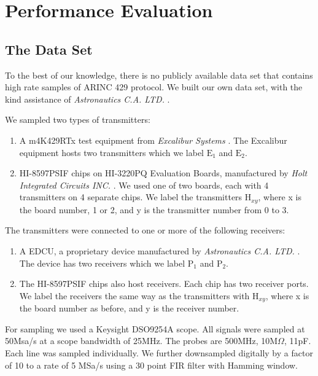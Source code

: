 \documentclass[conference]{IEEEtran}
\begin{document}
 
\section{Performance Evaluation}

\subsection{The Data Set} \label{TheDataSet}
  To the best of our knowledge, there is no publicly available data set that contains high rate samples of ARINC 429 protocol. We built our own data set, with the kind assistance of \textit{Astronautics C.A. LTD.} \cite{}.
  
  We sampled two types of transmitters:
  \begin{enumerate}
     \item A m4K429RTx test equipment from \textit{Excalibur Systems} \cite{}. The Excalibur equipment hosts two transmitters which we label \(\text{E}_1\) and \(\text{E}_2\).
     \item HI-8597PSIF chips on HI-3220PQ Evaluation Boards, manufactured by \textit{Holt Integrated Circuits INC.} \cite{}. We used one of two boards, each with 4 transmitters on 4 separate chips. We label the transmitters \(\text{H}_{xy}\), where x is the board number, 1 or 2, and y is the transmitter number from 0 to 3.
  \end{enumerate}
  
  The transmitters were connected to one or more of the following receivers:
  \begin{enumerate}
    \item A EDCU, a proprietary device manufactured by \textit{Astronautics C.A. LTD.} \cite{astronautics2019edcu}. The device has two receivers which we label \(\text{P}_1\) and \(\text{P}_2\).
    \item The HI-8597PSIF chips also host receivers. Each chip has two receiver ports. We label the receivers the same way as the transmitters with \(\text{H}_{xy}\), where x is the board number as before, and y is the receiver number.
  \end{enumerate}
  
  For sampling we used a Keysight DSO9254A scope. All signals were sampled at 50Msa/s at a scope bandwidth of 25MHz. The probes are 500MHz, 10M\(\Omega\), 11pF. Each line was sampled individually. We further downsampled digitally by a factor of 10 to a rate of 5 MSa/s using a 30 point FIR filter with Hamming window.
  
\end{document}
